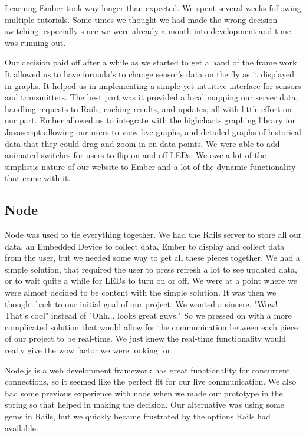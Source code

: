 \documentclass[letterpaper, 12 pt]{article}
\begin{document}
  Learning Ember took way longer than expected. We spent several weeks following multiple tutorials. Some times we thought we had made the wrong decision switching, especially since we were already a month into development and time was running out. 

  Our decision paid off after a while as we started to get a hand of the frame work. It allowed us to have formula’s to change sensor’s data on the fly as it displayed in graphs. It helped us in implementing a simple yet intuitive interface for sensors and transmitters. The best part was it provided a local mapping our server data, handling requests to Rails, caching results, and updates, all with little effort on our part. Ember allowed us to integrate with the highcharts graphing library for Javascript allowing our users to view live graphs, and detailed graphs of historical data that they could drag and zoom in on data points. We were able to add animated switches for users to flip on and off LEDs. We owe a lot of the simplistic nature of our website to Ember and a lot of the dynamic functionality that came with it. 


\subsection{Node}
Node was used to tie everything together. We had the Rails server to store all our data, an Embedded Device to collect data, Ember to display and collect data from the user, but we needed some way to get all these pieces together. We had a simple solution, that required the user to press refresh a lot to see updated data, or to wait quite a while for LEDs to turn on or off. We were at a point where we were almost decided to be content with the simple solution. It was then we thought back to our initial goal of our project. We wanted a sincere, "Wow! That’s cool" instead of "Ohh... looks great guys."  So we pressed on with a more complicated solution that would allow for the communication between each piece of our project to be real-time. We just knew the real-time functionality would really give the wow factor we were looking for.  

 Node.js is a web development framework has great functionality for concurrent connections, so it seemed like the perfect fit for our live communication. We also had some previous experience with node when we made our prototype in the spring so that helped in making the decision. Our alternative was using some gems in Rails, but we quickly became frustrated by the options Rails had available. 
\end{document}
